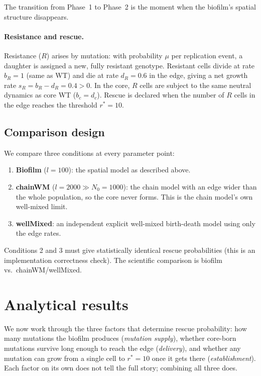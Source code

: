 \documentclass[12pt]{article}
\begin{document}
The transition from Phase~1 to Phase~2 is the moment when the biofilm's
spatial structure disappears.

\paragraph{Resistance and rescue.}
Resistance ($R$) arises by mutation: with probability $\mu$ per replication
event, a daughter is assigned a new, fully resistant genotype. Resistant
cells divide at rate $b_R = 1$ (same as WT) and die at rate $d_R = 0.6$ in
the edge, giving a net growth rate $s_R = b_R - d_R = 0.4 > 0$. In the core,
$R$ cells are subject to the same neutral dynamics as core WT ($b_c = d_c$).
Rescue is declared when the number of $R$ cells in the edge reaches the
threshold $r^* = 10$.

\subsection{Comparison design}
\label{sec:design}

We compare three conditions at every parameter point:

\begin{enumerate}
    \item \textbf{Biofilm} ($l = 100$): the spatial model as described above.
    \item \textbf{chainWM} ($l = 2000 \gg N_0 = 1000$): the chain model with
    an edge wider than the whole population, so the core never forms. This is
    the chain model's own well-mixed limit.
    \item \textbf{wellMixed}: an independent explicit well-mixed birth-death
    model using only the edge rates.
\end{enumerate}

Conditions 2 and 3 must give statistically identical rescue probabilities
(this is an implementation correctness check). The scientific comparison is
biofilm vs.\ chainWM/wellMixed.


\section{Analytical results}
\label{sec:analytics}

We now work through the three factors that determine rescue probability:
how many mutations the biofilm produces (\emph{mutation supply}), whether
core-born mutations survive long enough to reach the edge (\emph{delivery}),
and whether any mutation can grow from a single cell to $r^* = 10$ once it
gets there (\emph{establishment}). Each factor on its own does not tell the
full story; combining all three does.
\end{document}

